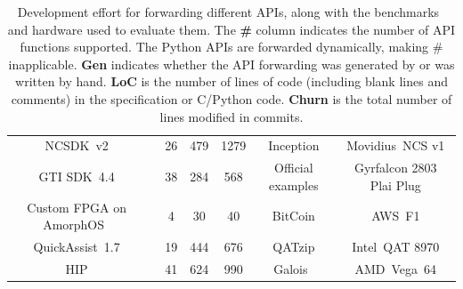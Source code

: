 \begin{table}
\begin{tabular}{ccccccc}
	NCSDK~v2                    & \checkmark       & 26                   & 479                    & 1279                    & Inception                & Movidius~NCS v1                         \\
	GTI SDK~4.4                 & \checkmark       & 38                   & 284                    & 568                     & Official examples    & Gyrfalcon 2803 Plai Plug                         \\
	Custom FPGA on AmorphOS~\cite{amorphos}     & \checkmark       & 4                    & 30                     & 40                      & BitCoin  & AWS~F1                                        \\
	QuickAssist~1.7             & \checkmark       & 19                   & 444                    & 676                     & QATzip                   & Intel~QAT 8970                      \\
	HIP                         & \checkmark       & 41                   & 624                    & 990                     & Galois~\cite{tao}        & AMD~Vega~64                                   \\
	\bottomrule
	\end{tabular}
	\caption{Development effort for forwarding different APIs, along with the benchmarks~\cite{inceptionv3,vggnet,rodinia} and hardware used to evaluate them.
      The \textbf{\#} column indicates the number of API functions supported.
      The Python APIs are forwarded dynamically, making \# inapplicable.
      \textbf{Gen} indicates whether the API forwarding was generated by \CAvA or was written by hand.
      \textbf{LoC} is the number of lines of code (including blank lines and comments) in the \CAvA specification or C/Python code.
      \textbf{Churn} is the total number of lines modified in commits.
    }
	\label{tab:apis-and-accelerators}
	\vspace*{-.2em}
\end{table}


